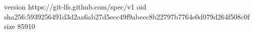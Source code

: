 version https://git-lfs.github.com/spec/v1
oid sha256:5939256491d3d2aa6ab27d5ecc49f9abecc8b22797b7764e0d079d264f508c0f
size 85910
